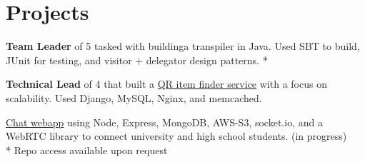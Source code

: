 \documentclass[]{hieudo-build}
\begin{document}
\begin{minipage}[t]{0.65\textwidth}
\begin{tightemize}
\end{tightemize}
\sectionsep



\section{Projects}
\descript{}
{\bf Team Leader} of 5 tasked with buildinga transpiler in Java. Used SBT to build, JUnit for testing, and visitor + delegator design patterns. *

\sectionsep

\descript{}
{\bf Technical Lead} of 4 that built a \href{https://github.com/JasonYao/Large-Scale-Final-Project-Lost-and-Found-Recovery-Service}{QR item finder service} with a focus on scalability. Used Django, MySQL, Nginx, and memcached.
\sectionsep


\descript{}
\href{https://github.com/JasonYao/university-video-meeter}{Chat webapp} using Node, Express, MongoDB, AWS-S3, socket.io, and a  WebRTC library to connect university and high school students. (in progress)\\
\sectionsep
* Repo access available upon request

\end{minipage} 
\end{document}
